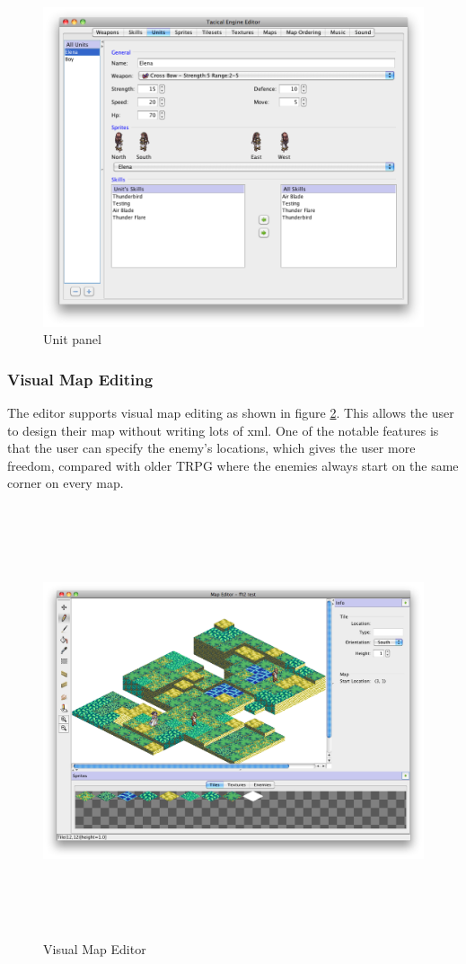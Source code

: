  \begin{figure}[htbp]
 	\centering
 		\includegraphics[scale=0.3]{figures/editor/Units.png}
 	\caption{Unit panel}
 	\label{fig:figures_editor_Units}
 \end{figure}
 
\clearpage
\subsubsection{Visual Map Editing}
The editor supports visual map editing as shown in figure \ref{fig:figures_editor_Map}.  This allows the user to design their map without writing lots of xml. One of the notable features is that the user can specify the enemy's locations, which gives the user more freedom, compared with older TRPG where the enemies always start on the same corner on every map.  

\begin{figure}[htbp]
	\centering
		\includegraphics[height=5in]{figures/editor/Map.png}
	\caption{Visual Map Editor}
	\label{fig:figures_editor_Map}
\end{figure}

